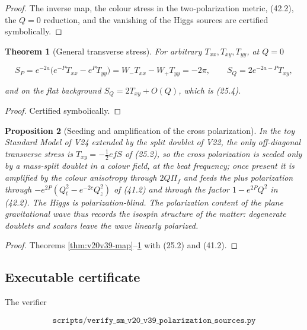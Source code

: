 \documentclass[11pt]{article}
\newtheorem{theorem}{Theorem}[section]
\newtheorem{proposition}[theorem]{Proposition}
\theoremstyle{remark}
\begin{document}
\begin{proof}
The inverse map, the colour stress in the two-polarization metric,
(42.2), the \(Q=0\) reduction, and the vanishing of the Higgs
sources are certified symbolically.
\end{proof}

\begin{theorem}[General transverse stress]
\label{thm:v20v39-general}
For arbitrary \(T_{xx},T_{xy},T_{yy}\), at \(Q=0\)

\[
 S_P=e^{-2a}\bigl(e^{-P}T_{xx}-e^{P}T_{yy}\bigr)=W_-T_{xx}-W_+T_{yy}=-2\pi,\qquad
 S_Q=2e^{-2a-P}T_{xy},                                                 \tag{42.3}
\]

and on the flat background \(S_Q=2T_{xy}+O(Q)\), which is (25.4).
\end{theorem}

\begin{proof}
Certified symbolically.
\end{proof}

\begin{proposition}[Seeding and amplification of the cross polarization]
\label{prop:v20v39-reading}
In the toy Standard Model of V24 extended by the split doublet of
V22, the only off-diagonal transverse stress is
\(T_{xy}=-\tfrac12efS\) of (25.2), so the cross polarization is seeded
only by a mass-split doublet in a colour field, at the beat
frequency; once present it is amplified by the colour anisotropy
through \(2Q\Pi_f\) and feeds the plus polarization through
\(-e^{2P}(Q_t^2-e^{-2c}Q_z^2)\) of (41.2) and through the factor
\(1-e^{2P}Q^2\) in (42.2).  The Higgs is polarization-blind.  The
polarization content of the plane gravitational wave thus records
the isospin structure of the matter: degenerate doublets and
scalars leave the wave linearly polarized.
\end{proposition}

\begin{proof}
Theorems \ref{thm:v20v39-map}--\ref{thm:v20v39-general} with (25.2)
and (41.2).
\end{proof}

\subsection{Executable certificate}

The verifier

\[
 \texttt{scripts/verify\_sm\_v20\_v39\_polarization\_sources.py}      \tag{42.4}
\]
\end{document}
